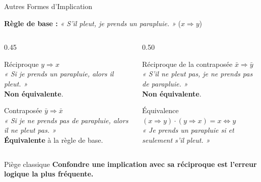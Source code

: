 \begin{frame}{Autres Formes d'Implication}

    \textbf{Règle de base :} \textit{« S'il pleut, je prends un parapluie. »} \quad (\(x \Rightarrow y\))

    \vspace{0.1cm}

    \begin{columns}[T]
        \begin{column}{0.45\textwidth}
            \begin{block}{Réciproque}
                \(y \Rightarrow x\)\\
                \textit{« Si je prends un parapluie, alors il pleut. »}\\
                \textbf{Non équivalente}.
            \end{block}

            \vspace{0.2cm}

            \begin{block}{Contraposée}
                \(\bar{y} \Rightarrow \bar{x}\)\\
                \textit{« Si je ne prends pas de parapluie, alors il ne pleut pas. »}\\
                \textbf{Équivalente} à la règle de base.
            \end{block}
        \end{column}
        \begin{column}{0.50\textwidth}
            \begin{block}{Réciproque de la contraposée}
                \(\bar{x} \Rightarrow \bar{y}\)\\
                \textit{« S'il ne pleut pas, je ne prends pas de parapluie. »}\\
                \textbf{Non équivalente}.
            \end{block}

            \vspace{0.2cm}

            \begin{block}{Équivalence}
                \((x \Rightarrow y) \cdot (y \Rightarrow x) = x \Leftrightarrow y\)\\
                \textit{« Je prends un parapluie si et seulement s'il pleut. »}
            \end{block}
        \end{column}
    \end{columns}

    \vspace{0.1cm}

    \begin{alertblock}{Piège classique}
        \centering
        \textbf{Confondre une implication avec sa réciproque est l'erreur logique la plus fréquente.}
    \end{alertblock}
\end{frame}


